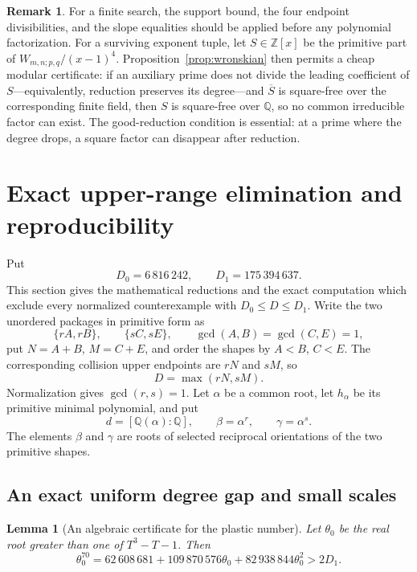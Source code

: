 \documentclass[11pt]{article}
\newtheorem{lemma}[theorem]{Lemma}
\theoremstyle{definition}
\newtheorem{remark}[theorem]{Remark}
\newcommand{\Q}{\mathbb Q}
\newcommand{\Z}{\mathbb Z}
\begin{document}
\begin{remark}
For a finite search, the support bound, the four endpoint divisibilities, and
the slope equalities should be applied before any polynomial factorization.
For a surviving exponent tuple, let \(S\in\Z[x]\) be the primitive part of
\(W_{m,n;p,q}/(x-1)^4\).  Proposition~\ref{prop:wronskian} then permits a
cheap modular certificate: if an auxiliary prime does not divide the leading
coefficient of \(S\)---equivalently, reduction preserves its degree---and
\(\overline S\) is square-free over the corresponding finite field, then
\(S\) is square-free over \(\Q\), so no common irreducible factor can exist.
The good-reduction condition is essential: at a prime where the degree drops,
a square factor can disappear after reduction.
\end{remark}


\section{Exact upper-range elimination and reproducibility}
\label{sec:computation}

Put
\[
 D_0=6\,816\,242,
 \qquad
 D_1=175\,394\,637.
\]
This section gives the mathematical reductions and the exact computation
which exclude every normalized counterexample with \(D_0\leq D\leq D_1\).
Write the two unordered packages in primitive form as
\[
 \{rA,rB\},\qquad \{sC,sE\},
 \qquad
 \gcd(A,B)=\gcd(C,E)=1,
\]
put \(N=A+B\), \(M=C+E\), and order the shapes by \(A<B\), \(C<E\).
The corresponding collision upper endpoints are \(rN\) and \(sM\), so
\[
 D=\max(rN,sM).
\]
Normalization gives \(\gcd(r,s)=1\).  Let \(\alpha\) be a common root,
let \(h_\alpha\) be its primitive minimal polynomial, and put
\[
 d=[\Q(\alpha):\Q],\qquad
 \beta=\alpha^r,\qquad \gamma=\alpha^s.
\]
The elements \(\beta\) and \(\gamma\) are roots of selected reciprocal
orientations of the two primitive shapes.

\subsection{An exact uniform degree gap and small scales}

\begin{lemma}[An algebraic certificate for the plastic number]
\label{lem:plasticpower}
Let \(\theta_0\) be the real root greater than one of \(T^3-T-1\).  Then
\begin{equation}
 \theta_0^{70}
 =62\,608\,681+109\,870\,576\theta_0
   +82\,938\,844\theta_0^2
 >2D_1.
 \tag{18.1}
\end{equation}
\end{lemma}
\end{document}
